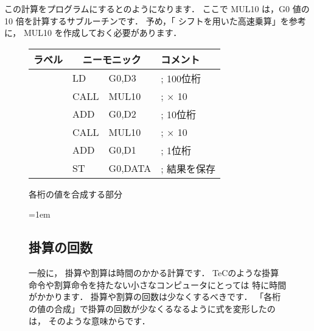 この計算をプログラムにするとのようになります．
ここで MUL10 は，G0 値の 10 倍を計算するサブルーチンです．
予め，「 シフトを用いた高速乗算」を参考に，
MUL10 を作成しておく必要があります．

\begin{figure}[bpt]
{\small\tt\begin{center}
\begin{tabular}{|l|l l l|} \hline
ラベル & \multicolumn{2}{|c}{ニーモニック} & コメント    \\
\hline
       & LD   & G0,D3         & ; 100位桁    \\
       & CALL & MUL10         & ; × 10      \\
       & ADD  & G0,D2         & ; 10位桁     \\
       & CALL & MUL10         & ; × 10      \\
       & ADD  & G0,D1         & ; 1位桁      \\
       & ST   & G0,DATA       & ; 結果を保存 \\
\hline
\end{tabular}
\end{center}}
\caption{各桁の値を合成する部分}
\label{fig:chap6:gousei}
\end{figure}

\begin{figure}[btp]
\begin{framed}{\parindent=1em
\subsection*{掛算の回数}
一般に，
掛算や割算は時間のかかる計算です．
TeCのような掛算命令や割算命令を持たない小さなコンピュータにとっては
特に時間がかかります．
掛算や割算の回数は少なくするべきです．
「各桁の値の合成」で掛算の回数が少なくるなるように式を変形したのは，
そのような意味からです．
}\end{framed}
\end{figure}

\newpage
